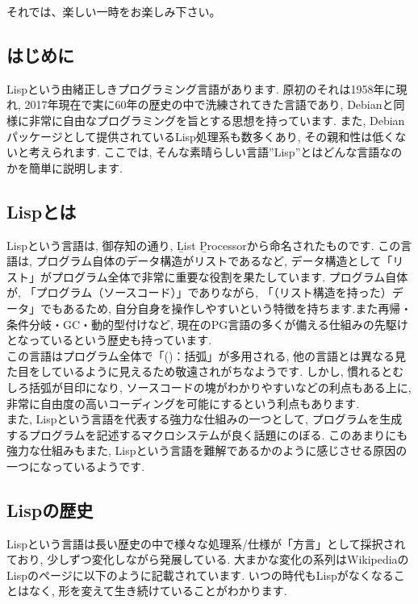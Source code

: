 \documentclass[mingoth,a4paper]{jsarticle}
\begin{document}
 それでは、楽しい一時をお楽しみ下さい。


\subsection{はじめに}

Lispという由緒正しきプログラミング言語があります.
原初のそれは1958年に現れ, 2017年現在で実に60年の歴史の中で洗練されてきた言語であり, Debianと同様に非常に自由なプログラミングを旨とする思想を持っています.
また, Debianパッケージとして提供されているLisp処理系も数多くあり, その親和性は低くないと考えられます. ここでは, そんな素晴らしい言語”Lisp”とはどんな言語なのかを簡単に説明します.

\subsection{Lispとは}

Lispという言語は, 御存知の通り, \b{Lis}t \b{P}rocessorから命名されたものです. この言語は, プログラム自体のデータ構造がリストであるなど, データ構造として「リスト」がプログラム全体で非常に重要な役割を果たしています. プログラム自体が, 「プログラム（ソースコード）」でありながら, 「（リスト構造を持った）データ」でもあるため, 自分自身を操作しやすいという特徴を持ちます.また再帰・条件分岐・GC・動的型付けなど, 現在のPG言語の多くが備える仕組みの先駆けとなっているという歴史も持っています. \vspace{1em}\\
この言語はプログラム全体で「()：括弧」が多用される, 他の言語とは異なる見た目をしているように見えるため敬遠されがちなようです. しかし, 慣れるとむしろ括弧が目印になり, ソースコードの塊がわかりやすいなどの利点もある上に, 非常に自由度の高いコーディングを可能にするという利点もあります. \vspace{1em}\\
また, Lispという言語を代表する強力な仕組みの一つとして, プログラムを生成するプログラムを記述するマクロシステムが良く話題にのぼる. このあまりにも強力な仕組みもまた, Lispという言語を難解であるかのように感じさせる原因の一つになっているようです. 

\subsection{Lispの歴史}

Lispという言語は長い歴史の中で様々な処理系/仕様が「方言」として採択されており, 少しずつ変化しながら発展している. 
大まかな変化の系列はWikipediaのLispのページに以下のように記載されています.
いつの時代もLispがなくなることはなく, 形を変えて生き続けていることがわかります.
\end{document}
